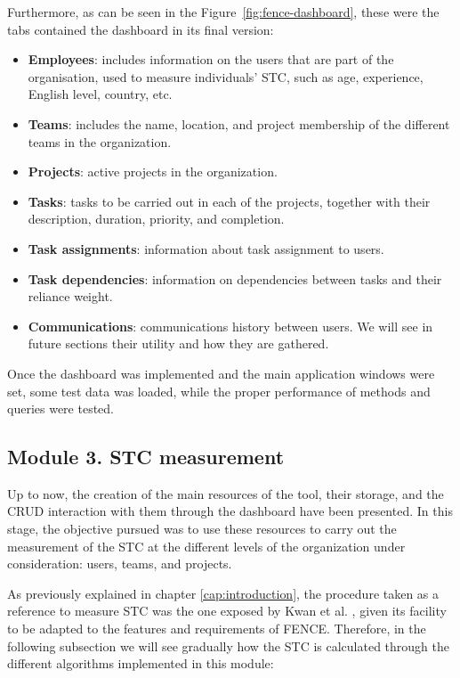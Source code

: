 Furthermore, as can be seen in the Figure~\ref{fig:fence-dashboard}, these were the tabs contained the dashboard in its final version:

\begin{itemize}
	\item \textbf{Employees}: includes information on the users that are part of the organisation, used to measure individuals’ STC, such as age, experience, English level, country, etc.
	\item \textbf{Teams}: includes the name, location, and project membership of the different teams in the organization.
	\item \textbf{Projects}: active projects in the organization.
	\item \textbf{Tasks}: tasks to be carried out in each of the projects, together with their description, duration, priority, and completion.
	\item \textbf{Task assignments}: information about task assignment to users.
	\item \textbf{Task dependencies}: information on dependencies between tasks and their reliance weight.
	\item \textbf{Communications}: communications history between users. We will see in future sections their utility and how they are gathered.
\end{itemize}

Once the dashboard was implemented and the main application windows were set, some test data was loaded, while the proper performance of methods and queries were tested.

\subsection{Module 3. STC measurement}
\label{sec:stc}

Up to now, the creation of the main resources of the tool, their storage, and the CRUD interaction with them through the dashboard have been presented. In this stage, the objective pursued was to use these resources to carry out the measurement of the STC at the different levels of the organization under consideration: users, teams, and projects.

As previously explained in chapter \ref{cap:introduction}, the procedure taken as a reference to measure STC was the one exposed by Kwan et al. \cite{kwan_weighted_2009,kwan_does_2011}, given its facility to be adapted to the features and requirements of FENCE. Therefore, in the following subsection we will see gradually how the STC is calculated through the different algorithms implemented in this module:

